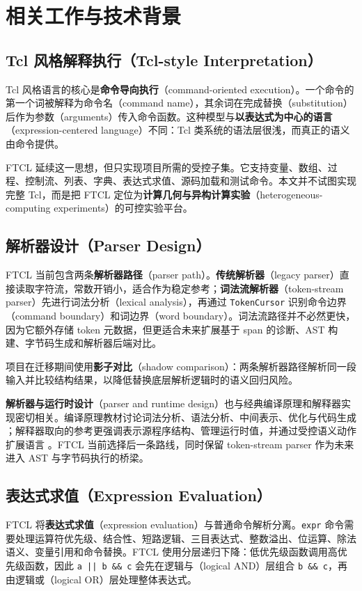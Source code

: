 ﻿\chapter{相关工作与技术背景}

\section{Tcl 风格解释执行（Tcl-style Interpretation）}
Tcl 风格语言的核心是\textbf{命令导向执行}（command-oriented execution）。一个命令的第一个词被解释为命令名（command name），其余词在完成替换（substitution）后作为参数（arguments）传入命令函数。这种模型与\textbf{以表达式为中心的语言}（expression-centered language）不同：Tcl 类系统的语法层很浅，而真正的语义由命令提供。

FTCL 延续这一思想，但只实现项目所需的受控子集。它支持变量、数组、过程、控制流、列表、字典、表达式求值、源码加载和测试命令。本文并不试图实现完整 Tcl，而是把 FTCL 定位为\textbf{计算几何与异构计算实验}（heterogeneous-computing experiments）的可控实验平台。

\section{解析器设计（Parser Design）}
FTCL 当前包含两条\textbf{解析器路径}（parser path）。\textbf{传统解析器}（legacy parser）直接读取字符流，常数开销小，适合作为稳定参考；\textbf{词法流解析器}（token-stream parser）先进行词法分析（lexical analysis），再通过 \texttt{TokenCursor} 识别命令边界（command boundary）和词边界（word boundary）。词法流路径并不必然更快，因为它额外存储 token 元数据，但更适合未来扩展基于 span 的诊断、AST 构建、字节码生成和解析器后端对比。

项目在迁移期间使用\textbf{影子对比}（shadow comparison）：两条解析器路径解析同一段输入并比较结构结果，以降低替换底层解析逻辑时的语义回归风险。

\textbf{解析器与运行时设计}（parser and runtime design）也与经典编译原理和解释器实现密切相关。编译原理教材讨论词法分析、语法分析、中间表示、优化与代码生成 \cite{aho2006compilers,muchnick1997advanced}；解释器取向的参考更强调表示源程序结构、管理运行时值，并通过受控语义动作扩展语言 \cite{nystrom2021crafting}。FTCL 当前选择后一条路线，同时保留 token-stream parser 作为未来进入 AST 与字节码执行的桥梁。

\section{表达式求值（Expression Evaluation）}
FTCL 将\textbf{表达式求值}（expression evaluation）与普通命令解析分离。\texttt{expr} 命令需要处理运算符优先级、结合性、短路逻辑、三目表达式、整数溢出、位运算、除法语义、变量引用和命令替换。FTCL 使用分层递归下降：低优先级函数调用高优先级函数，因此 \texttt{a || b \&\& c} 会先在逻辑与（logical AND）层组合 \texttt{b \&\& c}，再由逻辑或（logical OR）层处理整体表达式。

